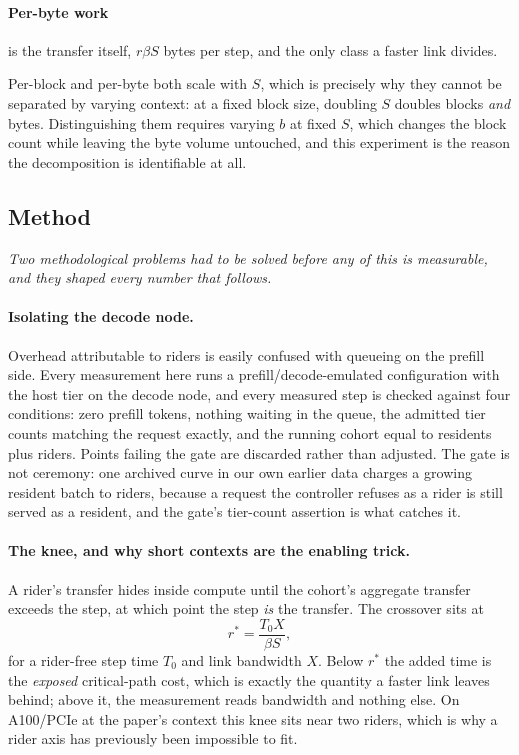 \paragraph{Per-byte work} is the transfer itself, $r \beta S$ bytes per step,
and the only class a faster link divides.

Per-block and per-byte both scale with $S$, which is precisely why they cannot
be separated by varying context: at a fixed block size, doubling $S$ doubles
blocks \emph{and} bytes. Distinguishing them requires varying $b$ at fixed $S$,
which changes the block count while leaving the byte volume untouched, and this
experiment is the reason the decomposition is identifiable at all.

\subsection{Method}
\label{sec:overhead:method}

\emph{Two methodological problems had to be solved before any of this is
measurable, and they shaped every number that follows.}

\paragraph{Isolating the decode node.} Overhead attributable to riders is easily
confused with queueing on the prefill side. Every measurement here runs a
prefill/decode-emulated configuration with the host tier on the decode node, and
every measured step is checked against four conditions: zero prefill tokens,
nothing waiting in the queue, the admitted tier counts matching the request
exactly, and the running cohort equal to residents plus riders. Points failing
the gate are discarded rather than adjusted. The gate is not ceremony: one
archived curve in our own earlier data charges a growing resident batch to
riders, because a request the controller refuses as a rider is still served as a
resident, and the gate's tier-count assertion is what catches it.

\paragraph{The knee, and why short contexts are the enabling trick.} A rider's
transfer hides inside compute until the cohort's aggregate transfer exceeds the
step, at which point the step \emph{is} the transfer. The crossover sits at
\begin{equation}
r^{*} = \frac{T_0 X}{\beta S},
\label{eq:overhead:knee}
\end{equation}
for a rider-free step time $T_0$ and link bandwidth $X$. Below $r^{*}$ the added
time is the \emph{exposed} critical-path cost, which is exactly the quantity a
faster link leaves behind; above it, the measurement reads bandwidth and nothing
else. On A100/PCIe at the paper's context this knee sits near two riders, which
is why a rider axis has previously been impossible to fit.

